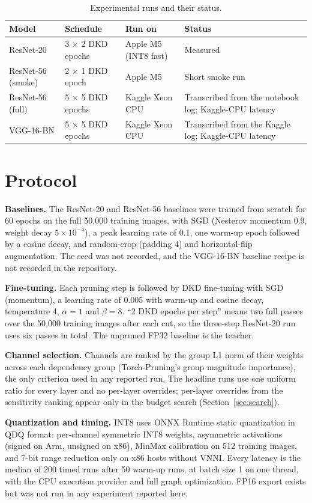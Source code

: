 \documentclass[oneside,a4paper,12pt]{report}
\begin{document}
\begin{table}[!htbp]
\centering
\small
\begin{tabularx}{\textwidth}{@{}l l l X@{}}
\toprule
Model & Schedule & Run on & Status\\
\midrule
ResNet-20 & 3 $\times$ 2 DKD epochs & Apple M5 (INT8 fast) & Measured\\
ResNet-56 (smoke) & 2 $\times$ 1 DKD epoch & Apple M5 & Short smoke run\\
ResNet-56 (full) & 5 $\times$ 5 DKD epochs & Kaggle Xeon CPU & Transcribed from the notebook log; Kaggle-CPU latency\\
VGG-16-BN & 5 $\times$ 5 DKD epochs & Kaggle Xeon CPU & Transcribed from the Kaggle log; Kaggle-CPU latency\\
\bottomrule
\end{tabularx}
\caption{Experimental runs and their status.}
\label{tab:setup}
\end{table}

\section{Protocol}
\textbf{Baselines.} The ResNet-20 and ResNet-56 baselines were trained from scratch for 60 epochs on the full 50,000 training images, with SGD (Nesterov momentum 0.9, weight decay $5\times10^{-4}$), a peak learning rate of 0.1, one warm-up epoch followed by a cosine decay, and random-crop (padding 4) and horizontal-flip augmentation. The seed was not recorded, and the VGG-16-BN baseline recipe is not recorded in the repository.

\textbf{Fine-tuning.} Each pruning step is followed by DKD fine-tuning with SGD (momentum), a learning rate of 0.005 with warm-up and cosine decay, temperature 4, $\alpha=1$ and $\beta=8$. ``2 DKD epochs per step'' means two full passes over the 50,000 training images after each cut, so the three-step ResNet-20 run uses six passes in total. The unpruned FP32 baseline is the teacher.

\textbf{Channel selection.} Channels are ranked by the group L1 norm of their weights across each dependency group (Torch-Pruning's group magnitude importance), the only criterion used in any reported run. The headline runs use one uniform ratio for every layer and no per-layer overrides; per-layer overrides from the sensitivity ranking appear only in the budget search (Section~\ref{sec:search}).

\textbf{Quantization and timing.} INT8 uses ONNX Runtime static quantization in QDQ format: per-channel symmetric INT8 weights, asymmetric activations (signed on Arm, unsigned on x86), MinMax calibration on 512 training images, and 7-bit range reduction only on x86 hosts without VNNI. Every latency is the median of 200 timed runs after 50 warm-up runs, at batch size 1 on one thread, with the CPU execution provider and full graph optimization. FP16 export exists but was not run in any experiment reported here.
\end{document}
